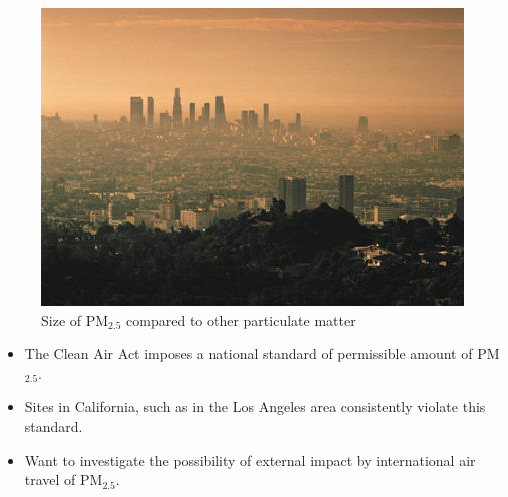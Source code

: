 \documentclass[notheorems,envcountsect,allowframebreaks,xcolor=svgnames,8pt]{beamer}
\begin{document}
\begin{frame}
\begin{figure}[H]
\centering
\includegraphics[scale=0.3]{smog.png}
\caption{Size of PM$_{2.5}$ compared to other particulate matter}
\label{fig:locations}
\end{figure}
\begin{itemize}
\item The Clean Air Act imposes a national standard of permissible amount of PM$_{2.5}$. 
\item Sites in California, such as in the Los Angeles area consistently violate this standard.
\item Want to investigate the possibility of external impact by international air travel of PM$_{2.5}$.
\end{itemize}
\end{frame}

%

\end{document}
